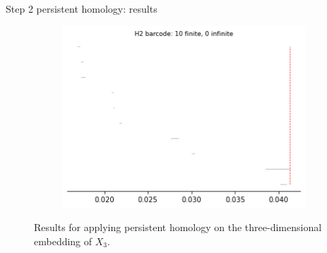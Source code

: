 \documentclass[xcolor={dvipsnames,svgnames}]{beamer}
\begin{document}
\begin{frame}{Step 2 persistent homology: results}
\begin{figure}[H]
\begin{subfigure}[b]{0.2\textwidth}
\includegraphics[width=\textwidth]{figures/X3_H2_barcode.png}
 \caption{}
\end{subfigure}
\caption{\scriptsize Results for applying persistent homology on the three-dimensional embedding of $X_3$.}
\end{figure}
\end{frame}
\end{document}
